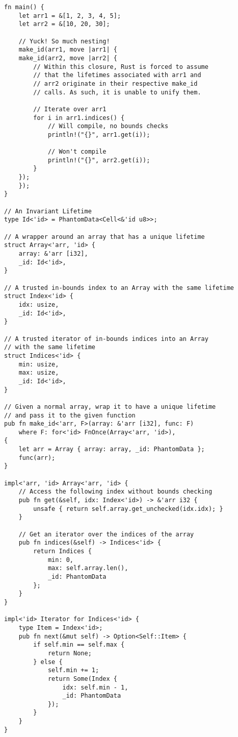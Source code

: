 \begin{verbatim}
fn main() {
    let arr1 = &[1, 2, 3, 4, 5];
    let arr2 = &[10, 20, 30];

    // Yuck! So much nesting!
    make_id(arr1, move |arr1| {
    make_id(arr2, move |arr2| {
        // Within this closure, Rust is forced to assume
        // that the lifetimes associated with arr1 and
        // arr2 originate in their respective make_id
        // calls. As such, it is unable to unify them.

        // Iterate over arr1
        for i in arr1.indices() {
            // Will compile, no bounds checks
            println!("{}", arr1.get(i));

            // Won't compile
            println!("{}", arr2.get(i));
        }
    });
    });
}

// An Invariant Lifetime
type Id<'id> = PhantomData<Cell<&'id u8>>;

// A wrapper around an array that has a unique lifetime
struct Array<'arr, 'id> {
    array: &'arr [i32],
    _id: Id<'id>,
}

// A trusted in-bounds index to an Array with the same lifetime
struct Index<'id> {
    idx: usize,
    _id: Id<'id>,
}

// A trusted iterator of in-bounds indices into an Array
// with the same lifetime
struct Indices<'id> {
    min: usize,
    max: usize,
    _id: Id<'id>,
}

// Given a normal array, wrap it to have a unique lifetime
// and pass it to the given function
pub fn make_id<'arr, F>(array: &'arr [i32], func: F)
    where F: for<'id> FnOnce(Array<'arr, 'id>),
{
    let arr = Array { array: array, _id: PhantomData };
    func(arr);
}

impl<'arr, 'id> Array<'arr, 'id> {
    // Access the following index without bounds checking
    pub fn get(&self, idx: Index<'id>) -> &'arr i32 {
        unsafe { return self.array.get_unchecked(idx.idx); }
    }

    // Get an iterator over the indices of the array
    pub fn indices(&self) -> Indices<'id> {
        return Indices {
            min: 0,
            max: self.array.len(),
            _id: PhantomData
        };
    }
}

impl<'id> Iterator for Indices<'id> {
    type Item = Index<'id>;
    pub fn next(&mut self) -> Option<Self::Item> {
        if self.min == self.max {
            return None;
        } else {
            self.min += 1;
            return Some(Index {
                idx: self.min - 1,
                _id: PhantomData
            });
        }
    }
}
\end{verbatim}

